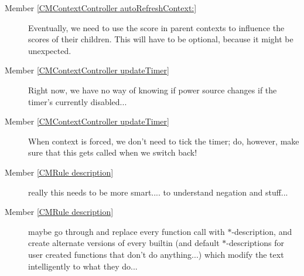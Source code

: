 \label{todo__todo000004}
\hypertarget{todo__todo000004}{}
 \begin{description}
\item[Member \hyperlink{interface_c_m_context_controller_f7513bfc5b0449fac6a28d39abfa4b79}{\mbox{[}CMContextController autoRefreshContext:\mbox{]}} ]Eventually, we need to use the score in parent contexts to influence the scores of their children. This will have to be optional, because it might be unexpected. \end{description}


\label{todo__todo000002}
\hypertarget{todo__todo000002}{}
 \begin{description}
\item[Member \hyperlink{interface_c_m_context_controller_6ad2cdc6ec1494e5f89a24cf5472600f}{\mbox{[}CMContextController updateTimer\mbox{]}} ]Right now, we have no way of knowing if power source changes if the timer's currently disabled... \end{description}


\label{todo__todo000002}
\hypertarget{todo__todo000002}{}
 \begin{description}
\item[Member \hyperlink{interface_c_m_context_controller_6ad2cdc6ec1494e5f89a24cf5472600f}{\mbox{[}CMContextController updateTimer\mbox{]}} ]When context is forced, we don't need to tick the timer; do, however, make sure that this gets called when we switch back! \end{description}


\label{todo__todo000005}
\hypertarget{todo__todo000005}{}
 \begin{description}
\item[Member \hyperlink{interface_c_m_rule_51963c06e66c9a9d7ca93720b4aa71c6}{\mbox{[}CMRule description\mbox{]}} ]really this needs to be more smart.... to understand negation and stuff... \end{description}


\label{todo__todo000005}
\hypertarget{todo__todo000005}{}
 \begin{description}
\item[Member \hyperlink{interface_c_m_rule_51963c06e66c9a9d7ca93720b4aa71c6}{\mbox{[}CMRule description\mbox{]}} ]maybe go through and replace every function call with $\ast$-description, and create alternate versions of every builtin (and default $\ast$-descriptions for user created functions that don't do anything...) which modify the text intelligently to what they do... \end{description}

